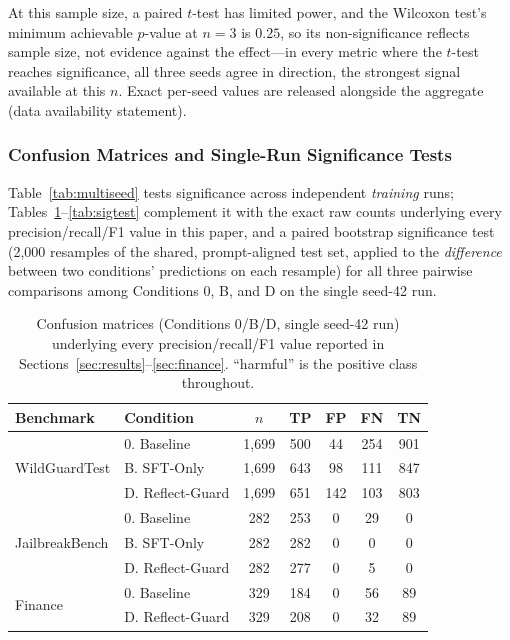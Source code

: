 \documentclass[Superintelligence,article,submit,pdftex,moreauthors]{Definitions/mdpi}
\begin{document}
At this sample size, a paired $t$-test has limited power, and the Wilcoxon test's minimum achievable $p$-value at $n=3$ is $0.25$, so its non-significance reflects sample size, not evidence against the effect---in every metric where the $t$-test reaches significance, all three seeds agree in direction, the strongest signal available at this $n$. Exact per-seed values are released alongside the aggregate (data availability statement).

\subsubsection{Confusion Matrices and Single-Run Significance Tests}
\label{sec:confusion}

Table~\ref{tab:multiseed} tests significance across independent \emph{training} runs; Tables~\ref{tab:confusion}--\ref{tab:sigtest} complement it with the exact raw counts underlying every precision/recall/F1 value in this paper, and a paired bootstrap significance test (2{,}000 resamples of the shared, prompt-aligned test set, applied to the \emph{difference} between two conditions' predictions on each resample) for all three pairwise comparisons among Conditions 0, B, and D on the single seed-42 run.

\begin{table}[H]
  \caption{Confusion matrices (Conditions 0/B/D, single seed-42 run) underlying every precision/recall/F1 value reported in Sections~\ref{sec:results}--\ref{sec:finance}. ``harmful'' is the positive class throughout.\label{tab:confusion}}
  \centering
  \small
  \begin{tabular}{llccccc}
    \toprule
    Benchmark & Condition & $n$ & TP & FP & FN & TN \\
    \midrule
    \multirow{3}{*}{WildGuardTest}
    & 0. Baseline       & 1{,}699 & 500 & 44  & 254 & 901 \\
    & B. SFT-Only       & 1{,}699 & 643 & 98  & 111 & 847 \\
    & D. Reflect-Guard  & 1{,}699 & 651 & 142 & 103 & 803 \\
    \midrule
    \multirow{3}{*}{JailbreakBench}
    & 0. Baseline       & 282 & 253 & 0 & 29 & 0 \\
    & B. SFT-Only       & 282 & 282 & 0 & 0  & 0 \\
    & D. Reflect-Guard  & 282 & 277 & 0 & 5  & 0 \\
    \midrule
    \multirow{2}{*}{Finance}
    & 0. Baseline       & 329 & 184 & 0 & 56 & 89 \\
    & D. Reflect-Guard  & 329 & 208 & 0 & 32 & 89 \\
    \bottomrule
  \end{tabular}
\end{table}
\end{document}
